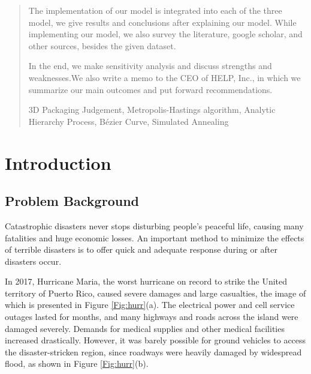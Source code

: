 \documentclass{mcmthesis}
\begin{document}
\begin{abstract}
The implementation of our model is integrated into each of the three model, we give results and conclusions after explaining our model. While implementing our model, we also survey the literature, google scholar, and other sources, besides the given dataset.

In the end, we make sensitivity analysis and discuss strengths and weaknesses.We also write a memo to the CEO of HELP, Inc., in which we summarize our main outcomes and put forward recommendations.
	
		\begin{keywords}
		3D Packaging Judgement, Metropolis-Hastings algorithm, Analytic Hierarchy Process, B\'{e}zier Curve, Simulated Annealing
		\end{keywords}
	\end{abstract}

\maketitle

\tableofcontents

\newpage

\section{Introduction}

\subsection{Problem Background}

Catastrophic disasters never stops disturbing people's peaceful life, causing many fatalities and huge economic losses. An important method to minimize the effects of terrible disasters is to offer quick and adequate response during or after disasters occur. 

In 2017, Hurricane Maria, the worst hurricane on record to strike the United territory of Puerto Rico, caused severe damages and large casualties, the image of which is presented in Figure \ref{Fig:hurr}(a). The electrical power and cell service outages lasted for months, and many highways and roads across the island were damaged severely. Demands for medical supplies and other medical facilities increased drastically. However, it was barely possible for ground vehicles to access the disaster-stricken region, since roadways were heavily damaged by widespread flood, as shown in Figure \ref{Fig:hurr}(b).
\end{document}
